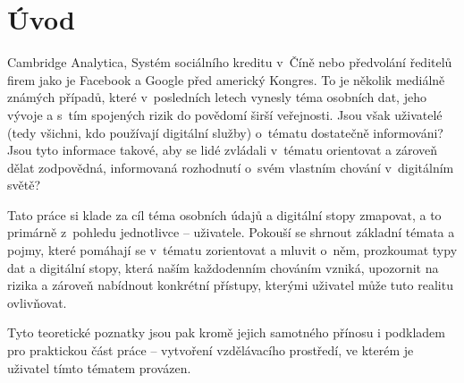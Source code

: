 \chapter*{Úvod}
\pagestyle{plain}

Cambridge Analytica, Systém sociálního kreditu v~Číně nebo předvolání ředitelů firem jako je Facebook a Google před americký Kongres. To je několik mediálně známých případů, které v~posledních letech vynesly téma osobních dat, jeho vývoje a s~tím spojených rizik do povědomí širší veřejnosti.
Jsou však uživatelé (tedy všichni, kdo používají digitální služby) o~tématu dostatečně informováni? Jsou tyto informace takové, aby se lidé zvládali v~tématu orientovat a zároveň dělat zodpovědná, informovaná rozhodnutí o~svém vlastním chování v~digitálním světě?

Tato práce si klade za cíl téma osobních údajů a digitální stopy zmapovat, a to primárně z~pohledu jednotlivce -- uživatele. Pokouší se shrnout základní témata a pojmy, které pomáhají se v~tématu zorientovat a mluvit o~něm, prozkoumat typy dat a digitální stopy, která naším každodenním chováním vzniká, upozornit na rizika a zároveň nabídnout konkrétní přístupy, kterými uživatel může tuto realitu ovlivňovat.

Tyto teoretické poznatky jsou pak kromě jejich samotného přínosu i podkladem pro praktickou část práce -- vytvoření vzdělávacího prostředí, ve kterém je uživatel tímto tématem provázen.
